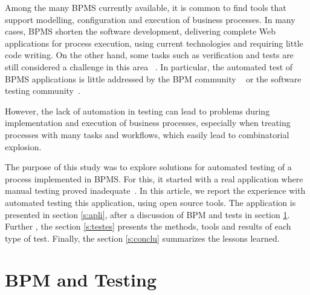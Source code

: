 \documentclass[runningheads,a4paper]{llncs}
\begin{document}
Among the many BPMS currently available, it is common to find tools that support modelling, configuration and execution of business processes. In many cases, BPMS shorten the software development, delivering complete Web applications for process execution, using current technologies and requiring little code writing. On the other hand, some tasks such as verification and tests are still considered a challenge in this area ~\cite{aalst2013survey}. In particular, the automated test of BPMS applications is little addressed by the BPM community ~\cite{weske} or the software testing community~\cite{graham2012experiences}.
 
However, the lack of automation in testing can lead to problems during implementation and execution of business processes, especially when treating processes with many tasks and workflows, which easily lead to combinatorial explosion.


The purpose of this study was to explore solutions for automated testing of a process implemented in BPMS. For this, it started with a real application where manual testing proved inadequate~\cite{sbsi2013}. In this article, we report the experience with automated testing this application, using open source tools. The application is presented in section \ref{s:apli}, after a discussion of BPM and tests in section \ref{s:bpmtest}. Further , the section \ref{s:testes} presents the methods, tools and results of each type of test. Finally, the section \ref{s:conclu} summarizes the lessons learned.


\section{BPM and Testing}\label{s:bpmtest}
\end{document}

